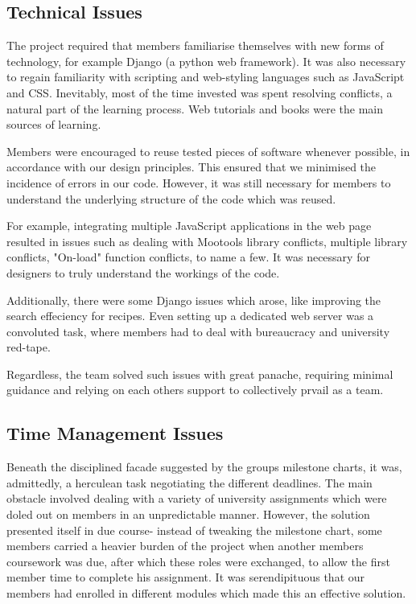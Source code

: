 \subsection{Technical Issues}

The project required that members familiarise themselves with new forms of technology, for example Django (a python web framework). It was also necessary to regain familiarity with scripting and web-styling languages such as JavaScript and CSS. Inevitably, most of the time invested was spent resolving conflicts, a natural part of the learning process. Web tutorials and books were the main sources of learning.

Members were encouraged to reuse tested pieces of software whenever possible, in accordance with our design principles. This ensured that we minimised the incidence of errors in our code. However, it was still necessary for members to understand the underlying structure of the code which was reused.

For example, integrating multiple JavaScript applications in the web page resulted in issues such as dealing with Mootools library conflicts, multiple library conflicts, "On-load" function conflicts, to name a few. It was necessary for designers to truly understand the workings of the code.

Additionally, there were some Django issues which arose, like improving the search effeciency for recipes. Even setting up a dedicated web server was a convoluted task, where members had to deal with bureaucracy and university red-tape.

Regardless, the team solved such issues with great panache, requiring minimal guidance and relying on each others support to collectively prvail as a team.

\subsection{Time Management Issues}

Beneath the disciplined facade suggested by the groups milestone charts, it was, admittedly, a herculean task negotiating the different deadlines. The main obstacle involved dealing with a variety of university assignments which were doled out on members in an unpredictable manner. However, the solution presented itself in due course- instead of tweaking the milestone chart, some members carried a heavier burden of the project when another members coursework was due, after which these roles were exchanged, to allow the first member time to complete his assignment. It was serendipituous that our members had enrolled in different modules which made this an effective solution.

